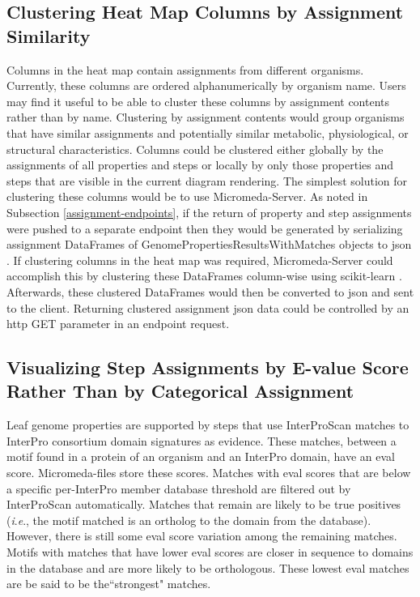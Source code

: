 \subsection{Clustering Heat Map Columns by Assignment Similarity}

Columns in the heat map contain assignments from different organisms. Currently, 
these columns are ordered alphanumerically by organism name. Users may find it 
useful to be able to cluster these columns by assignment contents rather than 
by name. Clustering by assignment contents would group organisms that have 
similar assignments and potentially similar metabolic, physiological, or 
structural characteristics. Columns could be clustered either globally by the 
assignments of all properties and steps or locally by only those properties and 
steps that are visible in the current diagram rendering. The simplest solution 
for clustering these columns would be to use Micromeda-Server. As noted in 
Subsection \ref{assignment-endpoints}, if the return of property and step 
assignments were pushed to a separate endpoint then they would be generated by 
serializing assignment DataFrames of GenomePropertiesResultsWithMatches objects 
to \gls{json} \cite{bray2014rfc}. If clustering columns in the heat map was 
required, Micromeda-Server could accomplish this by clustering these DataFrames 
column-wise using \gls{scikit}-learn \cite{pedregosa2011scikit}. Afterwards, these 
clustered DataFrames would then be converted to \gls{json} and sent to the 
client. Returning clustered assignment \gls{json} data could be controlled by an 
\gls{http} GET parameter in an endpoint request.

\subsection{Visualizing Step Assignments by E-value Score Rather Than by 
Categorical Assignment} \label{interface-e-value}

Leaf genome properties are supported by steps that use InterProScan matches to 
InterPro consortium domain signatures as evidence. These matches, between a 
motif found in a protein of an organism and an InterPro domain, have an 
\gls{eval} score. Micromeda-files store these scores. Matches with \gls{eval} 
scores that are below a specific per-InterPro member database threshold are 
filtered out by InterProScan automatically. Matches that remain are likely to be 
true positives (\textit{i}.\textit{e}., the motif matched is an ortholog to the domain from the 
database). However, there is still some \gls{eval} score variation among the 
remaining matches. Motifs with matches that have lower \gls{eval} scores are 
closer in sequence to domains in the database and are more likely to be 
orthologous. These lowest \gls{eval} matches are be said to be the``strongest" 
matches.

